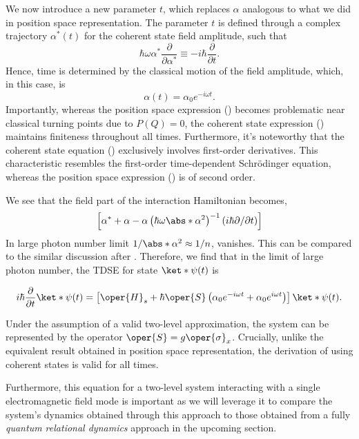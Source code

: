 We now introduce a new parameter \(t\), which replaces \(\alpha\) analogous to what we did 
in position space representation. The parameter \(t\) is defined through a complex trajectory 
\(\alpha^*(t)\) for the coherent state field amplitude, such that 
\begin{equation}
    \label{eq:class_jcm_eq27}
    \hbar \omega \alpha^* \dfrac{\partial}{\partial \alpha^*} \equiv 
    -i \hbar\dfrac{\partial}{\partial t}.
 \end{equation}
Hence, time is determined by the classical motion of the field amplitude, which, in this case, is 
\begin{equation}
    \label{eq:class_jcm_eq28}
    \alpha(t) = \alpha_0 e^{-i\omega t}.
\end{equation}
Importantly, whereas the position space expression () becomes 
problematic near classical turning 
points due to $P(Q) = 0$, the coherent state expression () maintains finiteness throughout all times. 
Furthermore, it's noteworthy that the coherent state equation () exclusively involves first-order 
derivatives. This characteristic resembles the first-order time-dependent Schrödinger 
equation, whereas the position space expression () is of second order.

We see that the field part of the interaction Hamiltonian becomes, 
\begin{eqnarray}
    \label{eq:class_jcm_eq29}
    \left[\alpha^* + \alpha - \alpha \left(\hbar \omega \abs*{\alpha}^2\right)^{-1}
    \left(i \hbar \partial / \partial t\right) \right]
\end{eqnarray}
In large photon number limit \(1/\abs*{\alpha}^2 \approx 1/n\), vanishes. This can be 
compared to the similar discussion after . Therefore, we find that in 
the limit of large photon number, the TDSE for state \(\ket*{\psi(t)}\) is 
\begin{mdframed}
    \begin{equation}
        \label{eq:class_jcm_eq30}
        i\hbar \dfrac{\partial}{\partial t} \ket*{\psi(t)} = \left[
            \oper{H}_s +  \hbar \oper{S} \left(\alpha_0 e^{-i \omega t} + \alpha_0 e^{i \omega t}\right) 
        \right] \ket*{\psi(t)}.
    \end{equation}
\end{mdframed}
Under the assumption of a valid two-level approximation, the system can be represented 
by the operator $\oper{S} = g\oper{\sigma}_x$. Crucially, unlike the equivalent result obtained in 
position space representation, the derivation of  using coherent 
states is valid for all times.

Furthermore, this equation for a two-level system interacting with a single electromagnetic field mode is important as we will leverage it to compare the system's dynamics obtained through this approach to those obtained from a fully \emph{quantum relational dynamics} approach in the upcoming section.